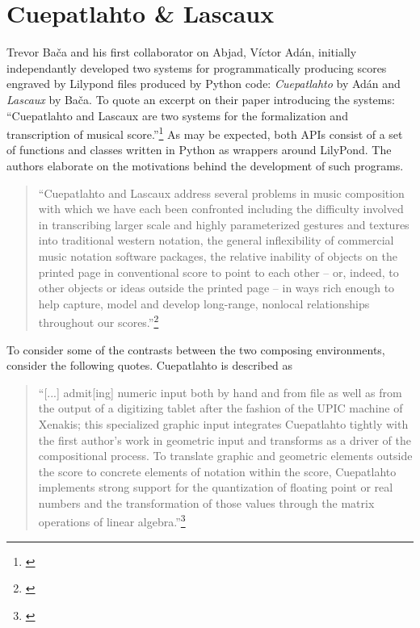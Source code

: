 \section{Cuepatlahto \& Lascaux}

Trevor Ba\v{c}a and his first collaborator on Abjad, V\'{i}ctor Ad\'{a}n, initially independantly developed two systems for programmatically producing scores engraved by Lilypond files produced by Python code: \textit{Cuepatlahto} by Ad\'{a}n and \textit{Lascaux} by Ba\v{c}a. To quote an excerpt on their paper introducing the systems: ``Cuepatlahto and Lascaux are two systems for the formalization and transcription of musical score.''\footnote{\citet[p.1]{lascaux}} As may be expected, both \acp{API} consist of a set of functions and classes written in Python as wrappers around LilyPond. The authors elaborate on the motivations behind the development of such programs.

\begin{quote}
\singlespacing
``Cuepatlahto and Lascaux address several problems in music composition with which we have each been confronted including the difficulty involved in transcribing larger scale and highly parameterized gestures and textures into traditional western notation, the general inflexibility of commercial music notation software packages, the relative inability of objects on the printed page in conventional score to point to each other -- or, indeed, to other objects or ideas outside the printed page -- in ways rich enough to help capture, model and develop long-range, nonlocal relationships throughout our scores.''\footnote{\citet[p.1]{lascaux}}
\end{quote}

To consider some of the contrasts between the two composing environments, consider the following quotes. Cuepatlahto is described as

\begin{quote}
\singlespacing
``[...] admit[ing] numeric input both by hand and from file as well as from the output of a digitizing tablet after the fashion of the UPIC machine of Xenakis; this specialized graphic input integrates Cuepatlahto tightly with the first author’s work in geometric input and transforms as a driver of the compositional process. To translate graphic and geometric elements outside the score to concrete elements of notation within the score, Cuepatlahto implements strong support for the quantization of floating point or real numbers and the transformation of those values through the matrix operations of linear algebra.''\footnote{\citet[p.12]{lascaux}}
\end{quote}

